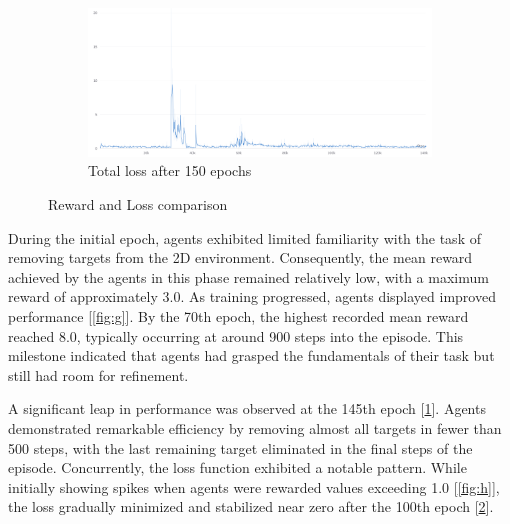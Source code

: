 \documentclass{scrartcl}
\begin{document}
\begin{figure}
\begin{subfigure}[b]{0.45\textwidth}
      \label{fig:i}
  \end{subfigure}
  \hfill
  \begin{subfigure}[b]{0.45\textwidth}
      \centering
      \includegraphics[width=\textwidth]{img/loss.png}
      \caption{Total loss after 150 epochs} 
      \label{fig:l}
  \end{subfigure}
  \caption{Reward and Loss comparison}
  \label{fig:s}
\end{figure}

During the initial epoch, agents exhibited limited familiarity with the task of removing targets from the 2D environment. Consequently, the mean reward achieved by the agents in this phase remained relatively low, with a maximum reward of approximately 3.0. As training progressed, agents displayed improved performance [\ref{fig:g}]. By the 70th epoch, the highest recorded mean reward reached 8.0, typically occurring at around 900 steps into the episode. This milestone indicated that agents had grasped the fundamentals of their task but still had room for refinement.

A significant leap in performance was observed at the 145th epoch [\ref{fig:i}]. Agents demonstrated remarkable efficiency by removing almost all targets in fewer than 500 steps, with the last remaining target eliminated in the final steps of the episode. Concurrently, the loss function exhibited a notable pattern. While initially showing spikes when agents were rewarded values exceeding 1.0 [\ref{fig:h}], the loss gradually minimized and stabilized near zero after the 100th epoch [\ref{fig:l}].
\end{document}
